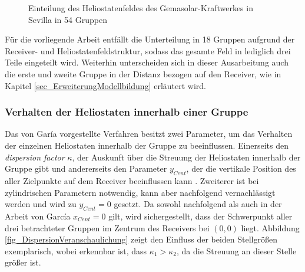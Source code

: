 \begin{figure}[h!]
    \centering
    \setlength{\fboxsep}{1pt}
    \setlength{\fboxrule}{1pt}
\caption[Einteilung des Heliostatenfeldes des Gemasolar-Kraftwerkes in Sevilla in 54 Gruppen]{Einteilung des Heliostatenfeldes des Gemasolar-Kraftwerkes in Sevilla in 54 Gruppen \cite[S.10]{Garcia2}}
    \label{fig_VerteilungHeliostateGarcia}
\end{figure}

Für die vorliegende Arbeit entfällt die Unterteilung in 18 Gruppen aufgrund der Receiver- und Heliostatenfeldstruktur, sodass das gesamte Feld in lediglich drei Teile eingeteilt wird.
Weiterhin unterscheiden sich in dieser Ausarbeitung auch die erste und zweite Gruppe in der Distanz bezogen auf den Receiver, wie in Kapitel \ref{sec_ErweiterungModellbildung} erläutert wird.

\subsubsection*{Verhalten der Heliostaten innerhalb einer Gruppe} \label{subsubsec_Gruppenverhalten}
Das von Garía vorgestellte Verfahren besitzt zwei Parameter, um das Verhalten der einzelnen Heliostaten innerhalb der Gruppe zu beeinflussen.
Einerseits den \textit{dispersion factor} $\kappa$, der Auskunft über die Streuung der Heliostaten innerhalb der Gruppe gibt und andererseits den Parameter $y_{Cent}$, der die vertikale Position des  aller Zielpunkte auf dem Receiver beeinflussen kann \cite[S.5]{Garcia2}.
Zweiterer ist bei zylindrischen Parametern notwendig, kann aber nachfolgend vernachlässigt werden und wird zu $y_{Cent} = 0$ gesetzt.
Da sowohl nachfolgend als auch in der Arbeit von García $x_{Cent} = 0$ gilt, wird sichergestellt, dass der Schwerpunkt aller drei betrachteter Gruppen im Zentrum des Receivers bei $(0,0)$ liegt.
Abbildung \ref{fig_DispersionVeranschaulichung} zeigt den Einfluss der beiden Stellgrößen exemplarisch, wobei erkennbar ist, dass $\kappa_1 > \kappa_2$, da die Streuung an dieser Stelle größer ist.


